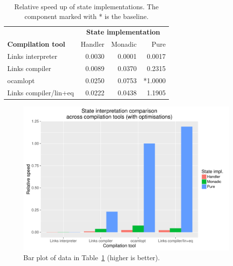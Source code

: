 \documentclass[12pt,mscres,cdtppar,twoside,openright,logo,rightchapter,normalheadings]{infthesis}
\theoremstyle{definition}
\begin{document}
\begin{table}
\centering
\begin{tabular}{| l || r | r | r |}
\cline{2-4}
\multicolumn{1}{c|}{~} & \multicolumn{3}{c|}{\textbf{State implementation}} \\
\cline{1-4}
\multicolumn{1}{|l||}{\textbf{Compilation tool}}  & Handler & Monadic & Pure \\
\hline
  Links interpreter & 0.0030   & 0.0001  & 0.0017 \\
\hline
  Links compiler    & 0.0089   & 0.0370 & 0.2315 \\
\hline
  ocamlopt          & 0.0250   & 0.0753  & *1.0000 \\
\hline
  Links compiler/lin+eq & 0.0222 & 0.0438 & 1.1905 \\
\hline
\end{tabular}
\caption{Relative speed up of state implementations. The component
  marked with * is the baseline.}\label{tbl:state-all-recovered}
\end{table}
\begin{figure}
\centering
\includegraphics[scale=0.6]{plots/stateAll_recovered.pdf}
\caption{Bar plot of data in Table~\ref{tbl:state-all-recovered} (higher is better).}\label{fig:state-all-recovered}
\end{figure}
\end{document}
